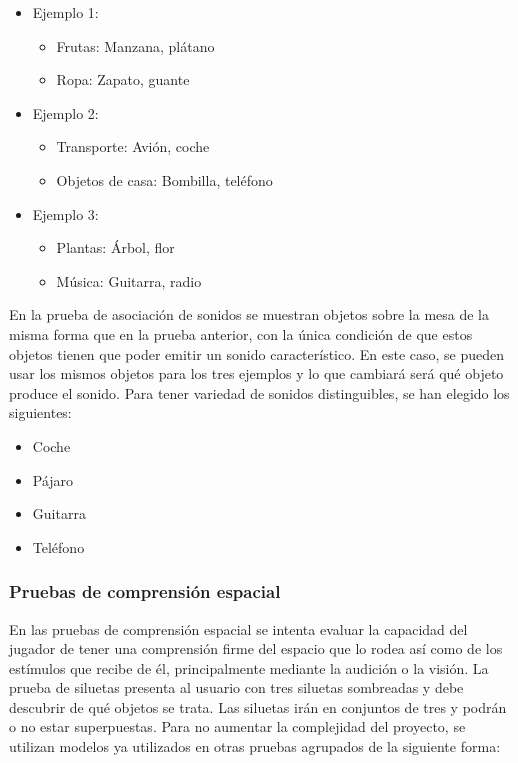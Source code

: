 \begin{itemize}
    \item {Ejemplo 1: 
        \begin{itemize}
            \item {Frutas: Manzana, plátano}
            \item {Ropa: Zapato, guante}
        \end{itemize}}
    \item {Ejemplo 2:
        \begin{itemize}
            \item {Transporte: Avión, coche}
            \item {Objetos de casa: Bombilla, teléfono}
        \end{itemize}}
    \item {Ejemplo 3:
        \begin{itemize}
            \item {Plantas: Árbol, flor}
            \item {Música: Guitarra, radio}
        \end{itemize}}
\end{itemize}

En la prueba de asociación de sonidos se muestran objetos sobre la mesa de la misma forma que en la prueba anterior, con la única condición de que estos objetos tienen que poder emitir un sonido característico. En este caso, se pueden usar los mismos objetos para los tres ejemplos y lo que cambiará será qué objeto produce el sonido. Para tener variedad de sonidos distinguibles, se han elegido los siguientes:

\begin{itemize}
    \item {Coche}
    \item {Pájaro}
    \item {Guitarra}
    \item {Teléfono}
\end{itemize}


\subsubsection{Pruebas de comprensión espacial}


En las pruebas de comprensión espacial se intenta evaluar la capacidad del jugador de tener una comprensión firme del espacio que lo rodea así como de los estímulos que recibe de él, principalmente mediante la audición o la visión. La prueba de siluetas presenta al usuario con tres siluetas sombreadas y debe descubrir de qué objetos se trata. Las siluetas irán en conjuntos de tres y podrán o no estar superpuestas. Para no aumentar la complejidad del proyecto, se utilizan modelos ya utilizados en otras pruebas agrupados de la siguiente forma:
	
